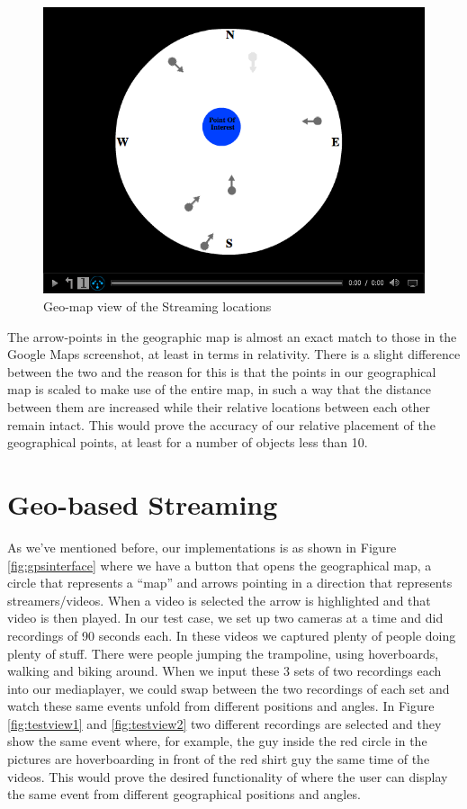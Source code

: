 \begin{figure}[ht!]
\begin{center}
	\includegraphics[scale=0.37]{TestfallGeomap.png}
	\caption{Geo-map view of the Streaming locations}
	\label{fig:testfallgeomap}
\end{center}
\end{figure}

The arrow-points in the geographic map is almost an exact match to those in the Google Maps screenshot, at least in terms in relativity. There is a slight difference between the two and the reason for this is that the points in our geographical map is scaled to make use of the entire map, in such a way that the distance between them are increased while their relative locations between each other remain intact. This would prove the accuracy of our relative placement of the geographical points, at least for a number of objects less than 10.

\section{Geo-based Streaming}
\label{sec:geobasedstreaming}

As we’ve mentioned before, our implementations is as shown in Figure \ref{fig:gpsinterface} where we have a button that opens the geographical map, a circle that represents a “map” and arrows pointing in a direction that represents streamers/videos. When a video is selected the arrow is highlighted and that video is then played. In our test case, we set up two cameras at a time and did recordings of 90 seconds each. In these videos we captured plenty of people doing plenty of stuff. There were people jumping the trampoline, using hoverboards, walking and biking around. When we input these 3 sets of two recordings each into our mediaplayer, we could swap between the two recordings of each set and watch these same events unfold from different positions and angles. In Figure \ref{fig:testview1} and \ref{fig:testview2} two different recordings are selected and they show the same event where, for example, the guy inside the red circle in the pictures are hoverboarding in front of the red shirt guy the same time of the videos. This would prove the desired functionality of where the user can display the same event from different geographical positions and angles.

